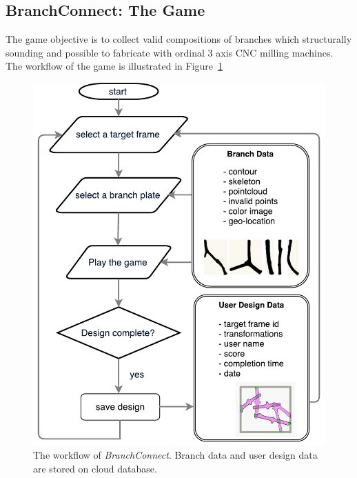 \subsection{BranchConnect: The Game}
The game objective is to collect valid compositions of branches which structurally sounding and possible to fabricate with ordinal 3 axis CNC milling machines.
The workflow of the game is illustrated in Figure~\ref{fig:game_flowchart}

\begin{figure}[ht]
  \begin{center}
    \includegraphics[width = 0.25\paperwidth]{images/system/systemFlowChart.pdf}
    \caption{The workflow of \textit{BranchConnect}. Branch data and user design data are stored on cloud database.}
    \label{fig:game_flowchart}
  \end{center}
\end{figure}

